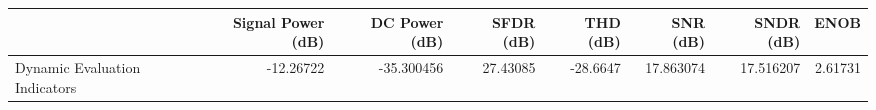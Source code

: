 \begin{tabular}{lrrrrrrr}
\toprule
{} &  Signal Power (dB) &  DC Power (dB) &  SFDR (dB) &  THD (dB) &   SNR (dB) &  SNDR (dB) &     ENOB \\
\midrule
Dynamic Evaluation Indicators &          -12.26722 &     -35.300456 &   27.43085 &  -28.6647 &  17.863074 &  17.516207 &  2.61731 \\
\bottomrule
\end{tabular}
